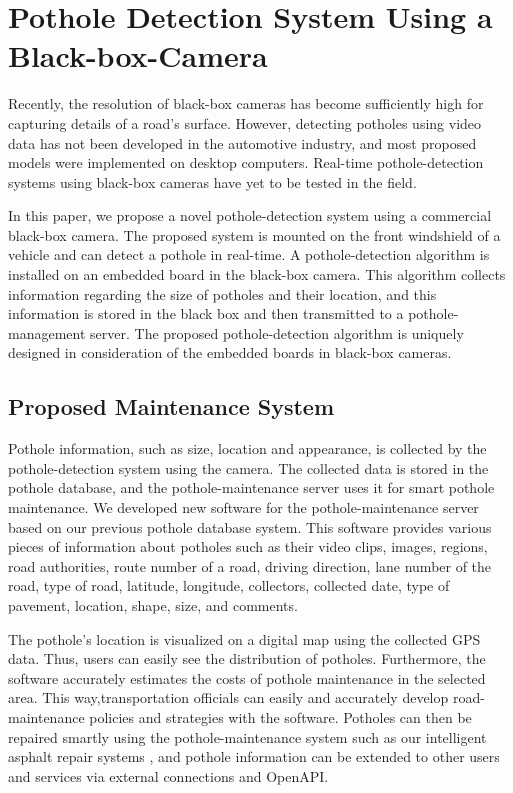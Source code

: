 \documentclass[12pt]{report}
\begin{document}
\section{Pothole Detection System Using a Black-box-Camera}
Recently, the resolution of black-box cameras has become sufficiently high for capturing details of a road’s surface. However, detecting potholes using video data has not been developed in the automotive industry, and most proposed models were implemented on desktop computers. Real-time pothole-detection systems using black-box cameras have yet to be tested in the field.

In this paper, we propose a novel pothole-detection system using a commercial black-box camera. The proposed system is mounted on the front windshield of a vehicle and can detect a pothole in real-time. A pothole-detection algorithm is installed on an embedded board in the black-box camera. This algorithm collects information regarding the size of potholes and their location, and this information is  
stored in the black box and then transmitted to a pothole-management server. The proposed pothole-detection algorithm is uniquely designed in consideration of the embedded boards in black-box cameras\cite{Jo}.

\subsection{Proposed Maintenance System}
Pothole information, such as size, location and appearance, is collected by the pothole-detection system using the camera. The collected data is stored in the pothole database, and the pothole-maintenance server uses it for smart pothole maintenance. We developed new software for the pothole-maintenance server based on our previous pothole database system. This software provides various pieces of information about potholes such as their video clips, images, regions, road authorities, route number of a road, driving direction, lane number of the road, type of road, latitude, longitude, collectors, collected date, type of pavement, location, shape, size, and comments\cite{Jo}.

 The pothole’s location is visualized on a digital map using the collected GPS data. Thus, users can easily see the distribution of potholes. Furthermore, the software accurately estimates the costs of pothole maintenance in the selected area. This way,transportation officials can easily and accurately develop road-maintenance policies and strategies with the software. Potholes can then be repaired smartly using the pothole-maintenance system such as our intelligent asphalt repair systems , and pothole information can be extended to other users and services via external connections and OpenAPI\cite{Jo}.
\end{document}
